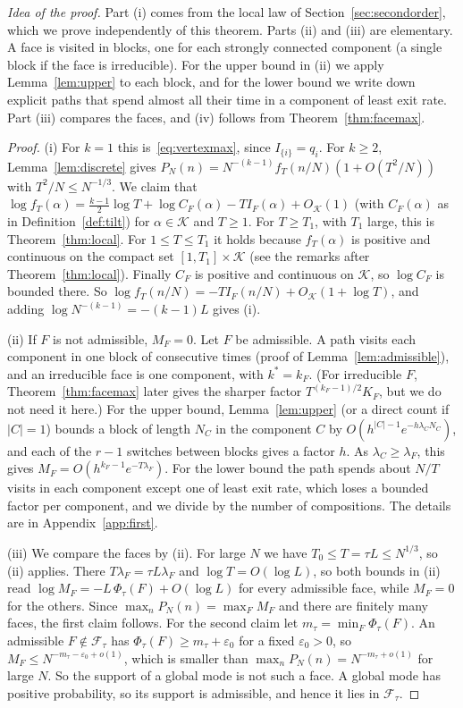 \emph{Idea of the proof.} Part (i) comes from the local law of
Section~\ref{sec:secondorder}, which we prove independently of this theorem.
Parts (ii) and (iii) are elementary. A face is visited in blocks, one for
each strongly connected component (a single block if the face is irreducible). For the upper bound in (ii) we apply
Lemma~\ref{lem:upper} to each block, and for the lower bound we write down
explicit paths that spend almost all their time in a component of least exit
rate. Part (iii) compares the faces, and (iv) follows from
Theorem~\ref{thm:facemax}.

\begin{proof}
(i) For $k=1$ this is~\eqref{eq:vertexmax}, since $I_{\{i\}}=q_i$. For $k\ge2$,
Lemma~\ref{lem:discrete} gives $P_N(n)=N^{-(k-1)}f_T(n/N)(1+O(T^2/N))$ with $T^2/N\le N^{-1/3}$.
We claim that
$\log f_T(\alpha)=\frac{k-1}2\log T+\log C_F(\alpha)-TI_F(\alpha)+O_{\mathcal K}(1)$
(with $C_F(\alpha)$ as in Definition~\ref{def:tilt}) for
$\alpha\in\mathcal K$ and $T\ge1$. For $T\ge T_1$, with $T_1$ large, this is Theorem~\ref{thm:local}.
For $1\le T\le T_1$ it holds because $f_T(\alpha)$ is positive and continuous on the compact set
$[1,T_1]\times\mathcal K$ (see the remarks after Theorem~\ref{thm:local}). Finally $C_F$ is positive
and continuous on $\mathcal K$, so $\log C_F$ is bounded there. So $\log f_T(n/N)=-TI_F(n/N)
+O_{\mathcal K}(1+\log T)$, and adding $\log N^{-(k-1)}=-(k-1)L$ gives (i).

(ii) If $F$ is not admissible, $M_F=0$. Let $F$ be admissible. A path visits each component
in one block of consecutive times (proof of Lemma~\ref{lem:admissible}), and an irreducible
face is one component, with $k^*=k_F$. (For irreducible $F$, Theorem~\ref{thm:facemax} later
gives the sharper factor $T^{(k_F-1)/2}K_F$, but we do not need it here.) For the upper bound, Lemma~\ref{lem:upper} (or a direct count if
$\lvert C\rvert=1$) bounds a block of length $N_C$ in the component $C$ by
$O(h^{\lvert C\rvert-1}e^{-h\lambda_CN_C})$, and each of the $r-1$
switches between blocks gives a factor $h$. As $\lambda_C\ge\lambda_F$, this gives
$M_F=O(h^{k_F-1}e^{-T\lambda_F})$. For the lower bound the path spends about $N/T$ visits in each
component except one of least exit rate, which loses a bounded factor per component, and we divide
by the number of compositions. The details are in Appendix~\ref{app:first}.

(iii) We compare the faces by (ii). For large $N$ we have $T_0\le T=\tau L\le N^{1/3}$, so (ii)
applies. There $T\lambda_F=\tau L\lambda_F$ and $\log T=O(\log L)$, so both bounds in (ii) read
$\log M_F=-L\,\Phi_\tau(F)+O(\log L)$ for every admissible face, while $M_F=0$ for the others.
Since $\max_nP_N(n)=\max_FM_F$ and there are finitely many faces, the first claim follows. For
the second claim let $m_\tau=\min_F\Phi_\tau(F)$. An admissible $F\notin\mathcal F_\tau$ has
$\Phi_\tau(F)\ge m_\tau+\varepsilon_0$ for a fixed $\varepsilon_0>0$, so
$M_F\le N^{-m_\tau-\varepsilon_0+o(1)}$, which is smaller than $\max_nP_N(n)=N^{-m_\tau+o(1)}$
for large $N$. So the support of a global mode is not such a face. A global mode has positive
probability, so its support is admissible, and hence it lies in $\mathcal F_\tau$.


\end{proof}
